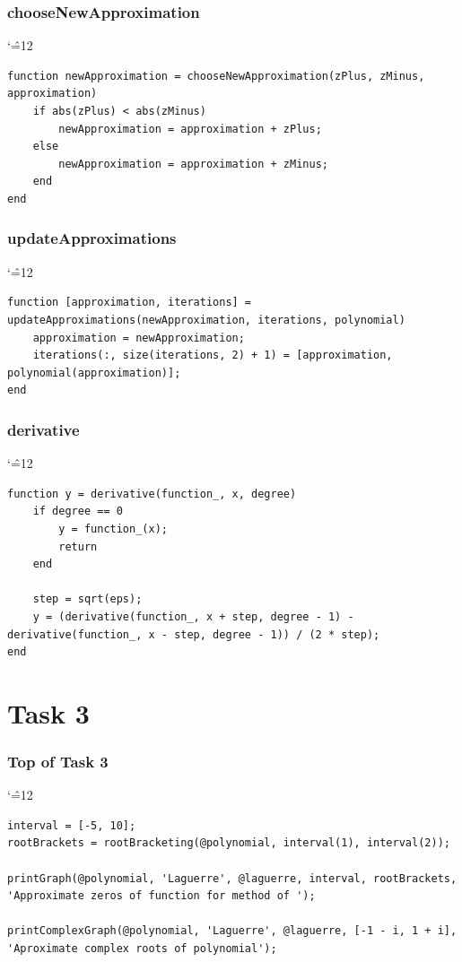 \documentclass[12pt]{report}
\newenvironment{simplechar}{%
   \catcode`\^=12
}{}
\begin{document}
\subsubsection{chooseNewApproximation}
\begin{simplechar}
\begin{lstlisting}
function newApproximation = chooseNewApproximation(zPlus, zMinus, approximation)
    if abs(zPlus) < abs(zMinus)
        newApproximation = approximation + zPlus;
    else
        newApproximation = approximation + zMinus;
    end
end
\end{lstlisting}
\end{simplechar}

\subsubsection{updateApproximations}
\begin{simplechar}
\begin{lstlisting}
function [approximation, iterations] = updateApproximations(newApproximation, iterations, polynomial)
    approximation = newApproximation;
    iterations(:, size(iterations, 2) + 1) = [approximation, polynomial(approximation)];
end
\end{lstlisting}
\end{simplechar}

\subsubsection{derivative}
\begin{simplechar}
\begin{lstlisting}
function y = derivative(function_, x, degree)
    if degree == 0
        y = function_(x);
        return
    end

    step = sqrt(eps);
    y = (derivative(function_, x + step, degree - 1) - derivative(function_, x - step, degree - 1)) / (2 * step);
end
\end{lstlisting}
\end{simplechar}

\section{Task 3}

\subsubsection{Top of Task 3}
\begin{simplechar}
\begin{lstlisting}
interval = [-5, 10];
rootBrackets = rootBracketing(@polynomial, interval(1), interval(2));

printGraph(@polynomial, 'Laguerre', @laguerre, interval, rootBrackets, 'Approximate zeros of function for method of ');

printComplexGraph(@polynomial, 'Laguerre', @laguerre, [-1 - i, 1 + i], 'Aproximate complex roots of polynomial');
\end{lstlisting}
\end{simplechar}
\end{document}
